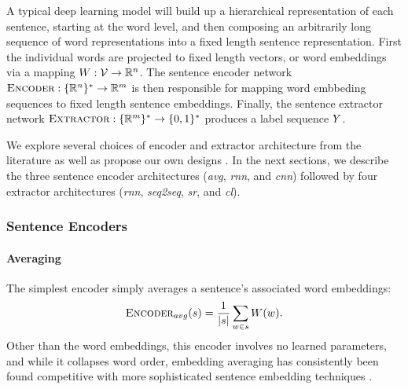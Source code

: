 A typical deep learning model will build up a hierarchical representation
of each sentence, starting at the word level, and then composing an arbitrarily
long sequence of word representations into a fixed length sentence 
representation.
First the individual words are 
projected to fixed length vectors, or word embeddings via a mapping
$W : \mathcal{V}
\rightarrow \mathbb{R}^{n}$. The sentence encoder network $\textsc{Encoder} :
\{\mathbb{R}^{n}\}^* \rightarrow \mathbb{R}^{m}$ is then 
responsible for mapping word embbeding sequences to fixed length sentence 
embeddings. Finally, the sentence extractor network $\textsc{Extractor} : 
\{\mathbb{R}^m\}^* \rightarrow \{0, 1\}^*$ produces a label 
sequence $Y$.

We explore several choices of encoder and extractor architecture from the 
literature \citep{cheng2016neural,nallapati2016summarunner} as well as 
propose our own designs \citep{kedzie2018deep}. In the next sections,
we describe the three sentence encoder architectures (\textit{avg}, 
\textit{rnn}, and \textit{cnn}) followed by four extractor architectures 
(\textit{rnn}, \textit{seq2seq}, \textit{sr}, and \textit{cl}).

\subsubsection{Sentence Encoders}
\paragraph{Averaging} The simplest encoder simply averages a sentence's
associated word embeddings:
\[ \textsc{Encoder}_{avg}(s) = \frac{1}{|s|} \sum_{w \in s} W(w). \]
Other than the word embeddings, this encoder involves no learned parameters,
and while it collapses word order, embedding averaging has consistently
been found competitive with more sophisticated sentence embedding techniques
\citep{iyyer2015deep,wieting2015towards,arora2016simple,wieting2017revisiting}.


